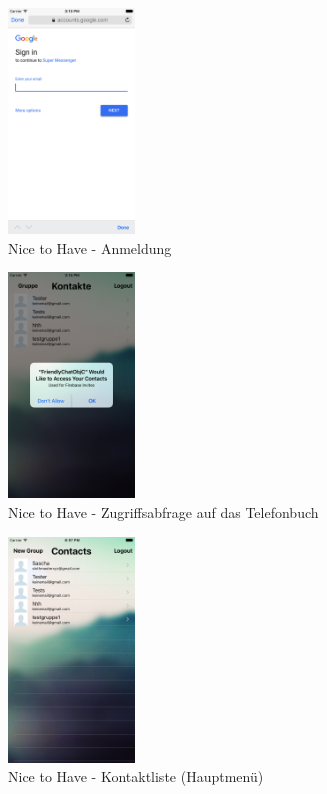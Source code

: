 \newpage
\begin{figure}[ht]
  \centering
    \includegraphics[width=0.3\textwidth]{images/signin_screen}
    \caption{Nice to Have - Anmeldung}
	 \label{fig:signin_screen}
\end{figure}
\begin{figure}[ht]
  \centering
    \includegraphics[width=0.3\textwidth]{images/zugriffsabfrage_screen}
    \caption{Nice to Have - Zugriffsabfrage auf das Telefonbuch}
	 \label{fig:zugriffsabfrage_screen}
\end{figure}
\begin{figure}[ht]
  \centering
    \includegraphics[width=0.3\textwidth]{images/address_screen}
    \caption{Nice to Have - Kontaktliste (Hauptmenü)}
	 \label{fig:address_screen}
\end{figure}
